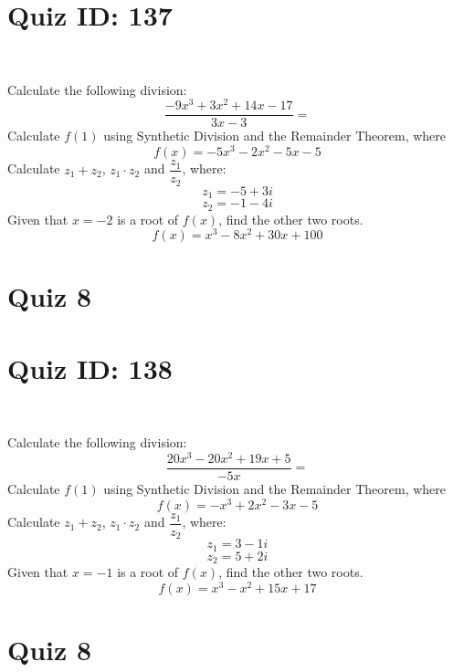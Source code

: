 \documentclass{exam}
\begin{document}
\section*{Quiz ID: 137}
\vspace{0.5cm}\
\vspace{1cm}\
\begin{questions}
\question Calculate the following division:\[\dfrac{
-9x^3 + 3x^2 + 14x - 17}{
3x - 3}=\] \makeemptybox{\stretch{2}}
\question Calculate $f(1)$ using Synthetic Division and the Remainder Theorem, where\[f(x) = 
-5x^3 - 2x^2 - 5x - 5\]
\newpage\question Calculate $z_1+z_2$, $z_1\cdot z_2$ and $\dfrac{z_1}{z_2}$, where:\[z_1=-5+3\mathit{i}\]\[z_2=-1-4\mathit{i}\]
\question Given that $x=-2$ is a root of $f(x)$, find the other two roots.\[f(x)=
x^3 - 8x^2 + 30x + 100\]\makeemptybox{\stretch{1}}
\end{questions}\newpage
\newpage
\section*{Quiz 8}
\section*{Quiz ID: 138}
\vspace{0.5cm}\
\vspace{1cm}\
\begin{questions}
\question Calculate the following division:\[\dfrac{
20x^3 - 20x^2 + 19x + 5}{
-5x}=\] 
\question Calculate $f(1)$ using Synthetic Division and the Remainder Theorem, where\[f(x) = 
-x^3 + 2x^2 - 3x - 5\]
\newpage\question Calculate $z_1+z_2$, $z_1\cdot z_2$ and $\dfrac{z_1}{z_2}$, where:\[z_1=3-1\mathit{i}\]\[z_2=5+2\mathit{i}\]\makeemptybox{\stretch{1}}
\question Given that $x=-1$ is a root of $f(x)$, find the other two roots.\[f(x)=
x^3 - x^2 + 15x + 17\]\makeemptybox{\stretch{1}}
\end{questions}\newpage
\newpage
\section*{Quiz 8}
\end{document}
